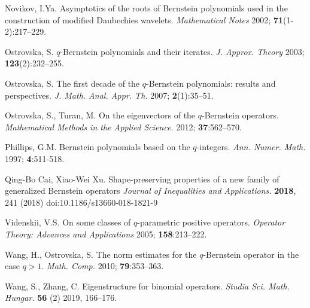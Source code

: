 \documentclass[12pt]{article}
\numberwithin{equation}{section} \theoremstyle{plain}
\theoremstyle{definition}
\theoremstyle{remark}
\begin{document}
\begin{thebibliography}{0}
 Novikov, I.Ya.
Asymptotics of the roots of Bernstein polynomials used in the construction of modified Daubechies wavelets. 
{\it Mathematical Notes} 2002; {\bf 71}(1-2):217--229.

 Ostrovska, S. 
$q$-Bernstein polynomials and their iterates.
{\it J. Approx. Theory} 2003; {\bf 123}(2):232--255.

 Ostrovska, S. 
The first decade of the $q$-Bernstein polynomials: results and perspectives. 
{\it J. Math. Anal. Appr. Th.} 2007; {\bf 2}(1):35--51.

 Ostrovska, S., Turan, M. 
On the eigenvectors of the $q$-Bernstein operators.
{\it Mathematical Methods in the Applied Science.} 2012; {\bf 37}:562--570.

 Phillips, G.M. 
Bernstein polynomials based on the $q$-integers.
{\it Ann. Numer. Math.} 1997; {\bf 4}:511-518.

 Qing-Bo Cai, Xiao-Wei Xu. 
Shape-preserving properties of a new family of generalized Bernstein operators 
{\it Journal of Inequalities and Applications.} {\bf 2018}, 241 (2018) doi:10.1186/s13660-018-1821-9

 Videnskii, V.S. 
On some classes of $q$-parametric positive operators. 
{\it Operator Theory: Advances and Applications} 2005; {\bf 158}:213--222.

 Wang, H., Ostrovska, S. 
The norm estimates for the $q$-Bernstein operator in the case $q>1.$ 
{\it Math. Comp.} 2010; {\bf 79}:353--363.

 Wang, S., Zhang, C. 
Eigenstructure for binomial operators. 
{\it Studia Sci. Math. Hungar.} {\bf 56} (2) 2019, 166–176.



\end{thebibliography}
\end{document}
